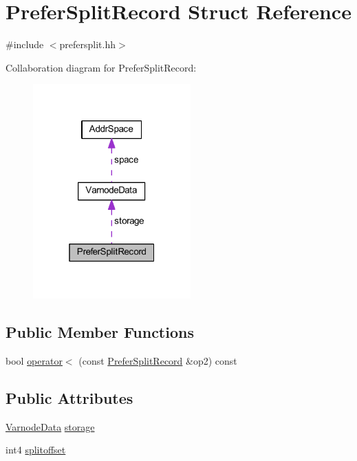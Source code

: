 \hypertarget{struct_prefer_split_record}{}\section{Prefer\+Split\+Record Struct Reference}
\label{struct_prefer_split_record}


{\ttfamily \#include $<$prefersplit.\+hh$>$}



Collaboration diagram for Prefer\+Split\+Record\+:
\nopagebreak
\begin{figure}[H]
\begin{center}
\leavevmode
\includegraphics[width=172pt]{struct_prefer_split_record__coll__graph}
\end{center}
\end{figure}
\subsection*{Public Member Functions}
\begin{DoxyCompactItemize}
\item 
bool \mbox{\hyperlink{struct_prefer_split_record_a1594db47a56d8287753cdcde658095d6}{operator$<$}} (const \mbox{\hyperlink{struct_prefer_split_record}{Prefer\+Split\+Record}} \&op2) const
\end{DoxyCompactItemize}
\subsection*{Public Attributes}
\begin{DoxyCompactItemize}
\item 
\mbox{\hyperlink{struct_varnode_data}{Varnode\+Data}} \mbox{\hyperlink{struct_prefer_split_record_a0d2ddb729cfcc94f538fb2a4018dd579}{storage}}
\item 
int4 \mbox{\hyperlink{struct_prefer_split_record_aff669b928ff82ac2fd441343ccb4ecf3}{splitoffset}}
\end{DoxyCompactItemize}


